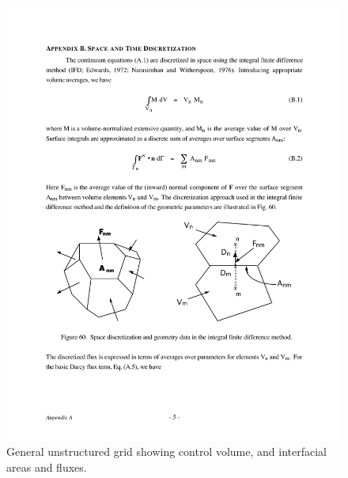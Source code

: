 \documentclass[12pt]{article}
\begin{document}
\begin{figure}[h]\centering
\includegraphics[scale=0.65]{./figs/unstruct_grid}
\caption{General unstructured grid showing control volume, and interfacial areas and fluxes.}\label{funstruct}
\end{figure}
\end{document}
